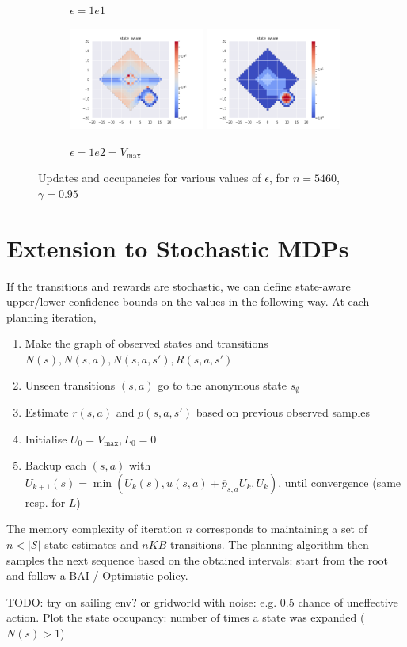 \documentclass{article}
\begin{document}
\begin{figure}[H]
\begin{subfigure}[b]{\textwidth}
        \caption{$\epsilon=1e1$}
    \end{subfigure}
    \begin{subfigure}[b]{\textwidth}
        \centering
        \includegraphics[width=0.49\textwidth]{img/epsilon/1e2/updates_state_aware.pdf}
        \includegraphics[width=0.49\textwidth]{img/epsilon/1e2/occupations_state_aware.pdf}
        \caption{$\epsilon=1e2 = V_{\max}$}
    \end{subfigure}
    \caption{Updates and occupancies for various values of $\epsilon$, for $n = 5460$, $\gamma=0.95$}
\end{figure}


\section{Extension to Stochastic MDPs}

If the transitions and rewards are stochastic, we can define 
state-aware upper/lower confidence bounds on the values in the following way. At each planning iteration,
\begin{enumerate}
    \item Make the graph of observed states and transitions $N(s), N(s,a), N(s,a,s'), R(s,a,s')$
    \item Unseen transitions $(s,a)$ go to the anonymous state $s_\emptyset$
    \item Estimate $r(s,a)$ and $p(s,a,s')$ based on previous observed samples
    \item Initialise $U_0 = V_{\max}, L_0 = 0$
    \item Backup each $(s,a)$ with $U_{k+1}(s) = \min(U_k(s), u(s,a) + \overline{p}_{s,a} U_k, U_k)$, until convergence (same resp. for $L$)
    \end{enumerate}
The memory complexity of iteration $n$ corresponds to maintaining a set of $n < |\mathcal{S}|$ state estimates and $nKB$ transitions. The planning algorithm then samples the next sequence based on the obtained intervals: start from the root and follow a BAI / Optimistic policy.

TODO: try on sailing env? or gridworld with noise: e.g. 0.5 chance of uneffective action. Plot the state occupancy: number of times a state was expanded ($N(s) > 1$)
    
\end{document}
